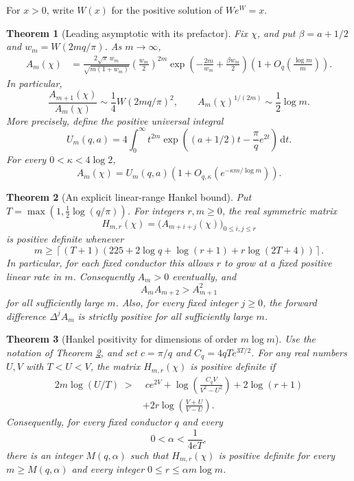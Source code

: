 \documentclass[11pt]{article}
\newtheorem{theorem}{Theorem}
\newcommand{\dd}{\,\mathrm d}
\begin{document}
For $x>0$, write $W(x)$ for the positive solution of $W e^W=x$.
\begin{theorem}[Leading asymptotic with its prefactor]\label{thm:asymp}
Fix $\chi$, and put $\beta=a+1/2$ and $w_m=W(2mq/\pi)$. As $m\to\infty$,
\begin{align}
 A_m(\chi)
 &=\frac{2\sqrt\pi\,w_m}{\sqrt{m(1+w_m)}}
 \left(\frac{w_m}{2}\right)^{2m}
 \exp\!\left(-\frac{2m}{w_m}+\frac{\beta w_m}{2}\right)
 \left(1+O_q\!\left(\frac{\log m}{m}\right)\right).
 \label{eq:asymp}
\end{align}
In particular,
\[
 \frac{A_{m+1}(\chi)}{A_m(\chi)}
 \sim \frac14 W(2mq/\pi)^2,
 \qquad
 A_m(\chi)^{1/(2m)}\sim\frac12\log m.
\]
More precisely, define the positive universal integral
\[
 U_m(q,a)=4\int_0^\infty t^{2m}
 \exp\!\left((a+1/2)t-\frac\pi q e^{2t}\right)\dd t.
\]
For every $0<\kappa<4\log2$,
\[
 A_m(\chi)=U_m(q,a)
 \left(1+O_{q,\kappa}\!\left(e^{-\kappa m/\log m}\right)\right).
\]
\end{theorem}

\begin{theorem}[An explicit linear-range Hankel bound]\label{thm:hankel}
Put $T=\max(1,\frac12\log(q/\pi))$. For integers $r,m\ge0$, the real symmetric matrix
\[
 H_{m,r}(\chi)=\bigl(A_{m+i+j}(\chi)\bigr)_{0\le i,j\le r}
\]
is positive definite whenever
\begin{equation}\label{eq:matrix-threshold}
 m\ge\left\lceil(T+1)\left(225+2\log q+\log(r+1)+r\log(2T+4)\right)\right\rceil.
\end{equation}
In particular, for each fixed conductor this allows $r$ to grow at a fixed positive linear rate in $m$. Consequently $A_m>0$ eventually, and
\[
 A_mA_{m+2}>A_{m+1}^2
\]
for all sufficiently large $m$. Also, for every fixed integer $j\ge0$, the forward difference $\Delta^j A_m$ is strictly positive for all sufficiently large $m$.
\end{theorem}

\begin{theorem}[Hankel positivity for dimensions of order $m\log m$]\label{thm:superlinear}
Use the notation of Theorem \ref{thm:hankel}, and set $c=\pi/q$ and $C_q=4qTe^{3T/2}$. For any real numbers $U,V$ with $T<U<V$, the matrix $H_{m,r}(\chi)$ is positive definite if
\begin{equation}\label{eq:interval-threshold}
 \begin{split}
 2m\log(U/T)\;>&\;ce^{2V}
 +\log\!\left(\frac{C_qV}{V^2-U^2}\right)
 +2\log(r+1)\\
 &+2r\log\!\left(\frac{V+U}{V-U}\right).
 \end{split}
\end{equation}
Consequently, for every fixed conductor $q$ and every
\[
 0<\alpha<\frac1{4eT},
\]
there is an integer $M(q,\alpha)$ such that $H_{m,r}(\chi)$ is positive definite for every $m\ge M(q,\alpha)$ and every integer $0\le r\le\alpha m\log m$.
\end{theorem}
\end{document}
